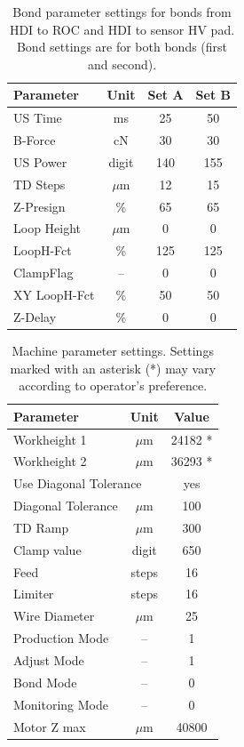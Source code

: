 \documentclass[10pt]{unlsilabsop}
\begin{document}
\begin{table}[h]
\begin{center}
\caption{Bond parameter settings for bonds from HDI to ROC and HDI to sensor HV pad. Bond settings are for both bonds (first and second).}
\label{tbl:bondpar}

\bigskip

\begin{tabular}{lc|c|c}
\toprule
Parameter & Unit & Set A & Set B  \\
    \midrule
US Time      &  ms    &  25 &  50 \\
B-Force      &  cN    &  30 &  30 \\
US Power     & digit  & 140 & 155 \\
TD Steps     & $\mu$m &  12 &  15 \\
    \midrule
Z-Presign    & \%     &  65 &  65 \\
Loop Height  & $\mu$m &   0 &   0 \\
LoopH-Fct    & \%     & 125 & 125 \\
ClampFlag    & --     &   0 &   0 \\
XY LoopH-Fct & \%     &  50 &  50 \\
Z-Delay      & \%     &   0 &   0 \\
   \bottomrule
\end{tabular}
\end{center}
\end{table}

\begin{table}[h]
\begin{center}
\caption{Machine parameter settings. Settings marked with an asterisk (*) may vary according to operator's preference.}
\label{tbl:otherpar}

\bigskip

\begin{tabular}{lcc}
\toprule
Parameter          & Unit   & Value \\
\midrule
Workheight 1       & $\mu$m & 24182 *\\
Workheight 2       & $\mu$m & 36293 * \\
\multicolumn{2}{l}{Use Diagonal Tolerance} & yes \\
Diagonal Tolerance & $\mu$m & 100 \\
TD Ramp            & $\mu$m & 300 \\
Clamp value        & digit  & 650 \\
Feed               & steps  & 16 \\
Limiter            & steps  & 16 \\
Wire Diameter      & $\mu$m & 25 \\
Production Mode    & --     & 1 \\
Adjust Mode        & --     & 1 \\
Bond Mode          & --     & 0 \\
Monitoring Mode    & --     & 0 \\
\midrule
Motor Z max        & $\mu$m & 40800 \\
    \bottomrule
\end{tabular}
\end{center}
\end{table}
\end{document}
